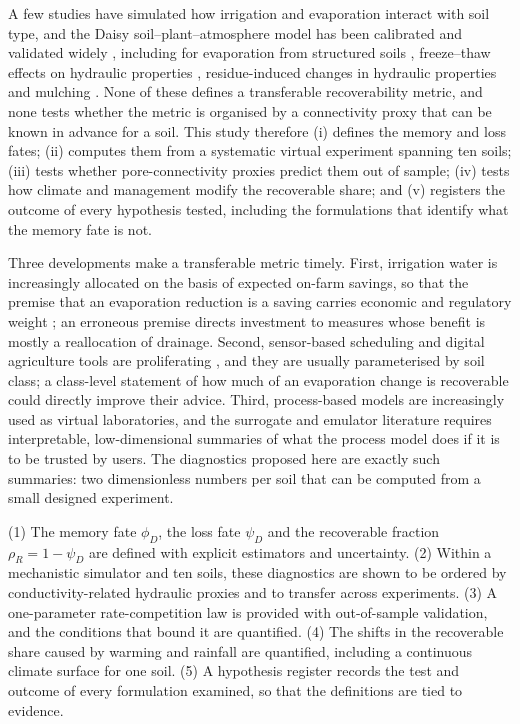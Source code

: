 \documentclass[preprint,12pt,authoryear]{elsarticle}
\begin{document}
A few studies have simulated how irrigation and evaporation interact with soil type, and the Daisy soil--plant--atmosphere model has been calibrated and validated widely \citep{Hansen1991,Hansen2012,Holbak2026}, including for evaporation from structured soils \citep{Leuther2024}, freeze--thaw effects on hydraulic properties \citep{Leuther2021,MirandaVelez2023}, residue-induced changes in hydraulic properties \citep{Leuther2026} and mulching \citep{Vuaille2024}. None of these defines a transferable recoverability metric, and none tests whether the metric is organised by a connectivity proxy that can be known in advance for a soil. This study therefore (i) defines the memory and loss fates; (ii) computes them from a systematic virtual experiment spanning ten soils; (iii) tests whether pore-connectivity proxies predict them out of sample; (iv) tests how climate and management modify the recoverable share; and (v) registers the outcome of every hypothesis tested, including the formulations that identify what the memory fate is not.

Three developments make a transferable metric timely. First, irrigation water is increasingly allocated on the basis of expected on-farm savings, so that the premise that an evaporation reduction is a saving carries economic and regulatory weight \citep{Perry2017,Pereira2012}; an erroneous premise directs investment to measures whose benefit is mostly a reallocation of drainage. Second, sensor-based scheduling and digital agriculture tools are proliferating \citep{Datta2023,Garcia2020}, and they are usually parameterised by soil class; a class-level statement of how much of an evaporation change is recoverable could directly improve their advice. Third, process-based models are increasingly used as virtual laboratories, and the surrogate and emulator literature \citep{Razavi2012,Asher2015} requires interpretable, low-dimensional summaries of what the process model does if it is to be trusted by users. The diagnostics proposed here are exactly such summaries: two dimensionless numbers per soil that can be computed from a small designed experiment.

(1) The memory fate $\phi_D$, the loss fate $\psi_D$ and the recoverable fraction $\rho_R=1-\psi_D$ are defined with explicit estimators and uncertainty. (2) Within a mechanistic simulator and ten soils, these diagnostics are shown to be ordered by conductivity-related hydraulic proxies and to transfer across experiments. (3) A one-parameter rate-competition law is provided with out-of-sample validation, and the conditions that bound it are quantified. (4) The shifts in the recoverable share caused by warming and rainfall are quantified, including a continuous climate surface for one soil. (5) A hypothesis register records the test and outcome of every formulation examined, so that the definitions are tied to evidence.
\end{document}
